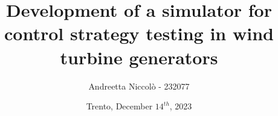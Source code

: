 \author{Andreetta Niccolò - 232077}
\title{Development of a simulator for control strategy testing in wind turbine generators}
\subtitle{}
\institute{}
\date{Trento, December $14^{th}$, 2023}
{
\begin{frame}[plain]
    \maketitle
\end{frame}
}